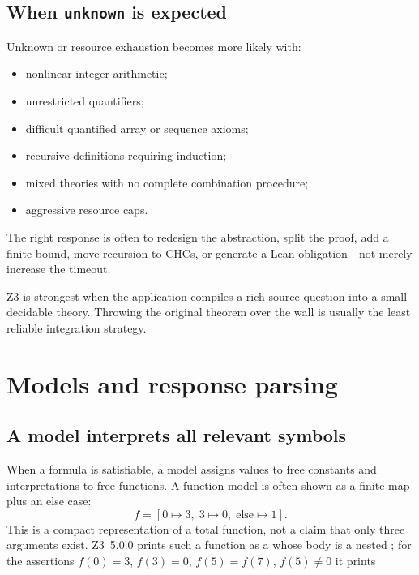 \documentclass[10pt,letterpaper,oneside]{report}
\newcommand{\code}[1]{\texttt{\detokenize{#1}}}
\begin{document}
\section{When \texttt{unknown} is expected}

Unknown or resource exhaustion becomes more likely with:

\begin{itemize}
\item nonlinear integer arithmetic;
\item unrestricted quantifiers;
\item difficult quantified array or sequence axioms;
\item recursive definitions requiring induction;
\item mixed theories with no complete combination procedure;
\item aggressive resource caps.
\end{itemize}

The right response is often to redesign the abstraction, split the proof, add a finite bound, move recursion to CHCs, or generate a Lean obligation---not merely increase the timeout.

\begin{mentalmodel}
Z3 is strongest when the application compiles a rich source question into a small decidable theory. Throwing the original theorem over the wall is usually the least reliable integration strategy.
\end{mentalmodel}

\chapter{Models and response parsing}
\label{chap:models}

\section{A model interprets all relevant symbols}

When a formula is satisfiable, a model assigns values to free constants and interpretations to free functions. A function model is often shown as a finite map plus an else case:
\[
  f=[0\mapsto3,\;3\mapsto0,\;\text{else}\mapsto1].
\]
This is a compact representation of a total function, not a claim that only three arguments exist.
Z3~5.0.0 prints such a function as a \code{define-fun} whose body is a nested \code{ite}; for the assertions $f(0)=3$, $f(3)=0$, $f(5)=f(7)$, $f(5)\ne0$ it prints
\end{document}
